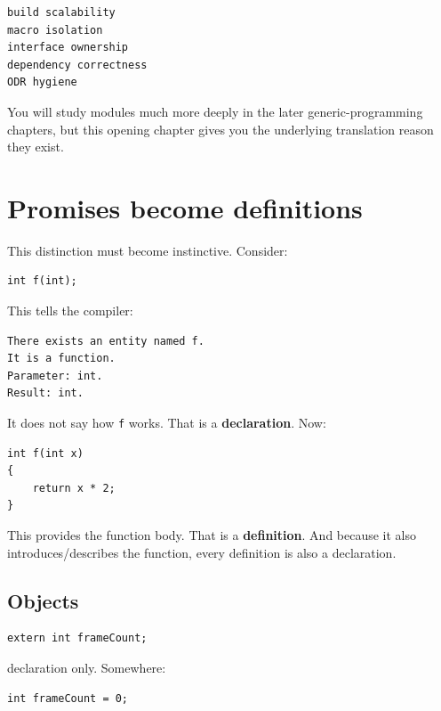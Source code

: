 \begin{verbatim}
build scalability
macro isolation
interface ownership
dependency correctness
ODR hygiene
\end{verbatim}

You will study modules much more deeply in the later generic-programming chapters, but this opening chapter gives you the underlying translation reason they exist.

\section{Promises become definitions}\label{05-engine-i-ch002-promises-become-definitions}

\hypertarget{05-engine-i-ch002-promises-become-definitions}{}

This distinction must become instinctive. Consider:

\begin{verbatim}
int f(int);
\end{verbatim}

This tells the compiler:

\begin{verbatim}
There exists an entity named f.
It is a function.
Parameter: int.
Result: int.
\end{verbatim}

It does not say how \texttt{f} works. That is a \textbf{declaration}. Now:

\begin{verbatim}
int f(int x)
{
    return x * 2;
}
\end{verbatim}

This provides the function body. That is a \textbf{definition}. And because it also introduces/describes the function, every definition is also a declaration.

\subsection{Objects}\label{05-engine-i-ch002-objects}

\hypertarget{05-engine-i-ch002-objects}{}

\begin{verbatim}
extern int frameCount;
\end{verbatim}

declaration only. Somewhere:

\begin{verbatim}
int frameCount = 0;
\end{verbatim}

